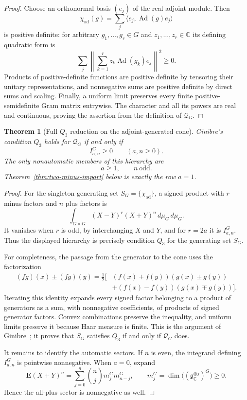 \documentclass[11pt,reqno]{amsart}
\theoremstyle{plain}
\newtheorem{theorem}{Theorem}[section]
\theoremstyle{definition}
\newcommand{\chiad}{\chi_{\mathrm{ad}}}
\newcommand{\Qcone}{\mathcal Q}
\begin{document}
\begin{proof}
Choose an orthonormal basis $(e_j)$ of the real adjoint module.  Then
\[
 \chiad(g)=\sum_j\langle e_j,\operatorname{Ad}(g)e_j\rangle
\]
is positive definite: for arbitrary $g_1,\ldots,g_r\in G$ and
$z_1,\ldots,z_r\in\mathbb C$ its defining quadratic form is
\[
 \sum_j\left\lVert\sum_{k=1}^r
 z_k\operatorname{Ad}(g_k)e_j\right\rVert^2\geq0.
\]
Products of positive-definite functions are positive definite by tensoring
their unitary representations, and nonnegative sums are positive definite by
direct sums and scaling.  Finally, a uniform limit preserves every finite
positive-semidefinite Gram matrix entrywise.  The character and all its
powers are real and continuous, proving the assertion from the definition of
$\Qcone_G$.
\end{proof}

\begin{theorem}[Full $Q_3$ reduction on the adjoint-generated cone]
\label{thm:full-cone-reduction}
Ginibre's condition $Q_3$ holds for $\Qcone_G$ if and only if
\[
 I^G_{a,n}\geq0\qquad(a,n\geq0).
\]
The only nonautomatic members of this hierarchy are
\[
 a\geq1,\qquad n\ \text{odd}.
\]
Theorem~\ref{thm:two-minus-import} below is exactly the row $a=1$.
\end{theorem}

\begin{proof}
For the singleton generating set $S_G=\{\chiad\}$, a signed product with
$r$ minus factors and $n$ plus factors is
\[
 \int_{G\times G}(X-Y)^r(X+Y)^n\,d\mu_G\,d\mu_G.
\]
It vanishes when $r$ is odd, by interchanging $X$ and $Y$, and for $r=2a$
it is $I^G_{a,n}$.  Thus the displayed hierarchy is precisely condition
$Q_3$ for the generating set $S_G$.

For completeness, the passage from the generator to the cone uses the
factorization
\[
 \begin{aligned}
 (fg)(x)\pm(fg)(y)
 =\frac12\bigl[&(f(x)+f(y))(g(x)\pm g(y))\\
               &+(f(x)-f(y))(g(x)\mp g(y))\bigr].
 \end{aligned}
\]
Iterating this identity expands every signed factor belonging to a product
of generators as a sum, with nonnegative coefficients, of products of
signed generator factors.  Convex combinations preserve the inequality,
and uniform limits preserve it because Haar measure is finite.  This is the
argument of Ginibre~\cite[Proposition~1 and (1.5)]{Ginibre1970}; it proves
that $S_G$ satisfies $Q_3$ if and only if $\Qcone_G$ does.

It remains to identify the automatic sectors.  If $n$ is even, the
integrand defining $I^G_{a,n}$ is pointwise nonnegative.  When $a=0$, expand
\[
 \mathbf E(X+Y)^n
 =\sum_{j=0}^{n}\binom nj m_j^Gm_{n-j}^G,
 \qquad
 m_j^G=\dim\bigl((\mathfrak g_{\mathbb C}^{\otimes j})^G\bigr)\geq0.
\]
Hence the all-plus sector is nonnegative as well.
\end{proof}
\end{document}
